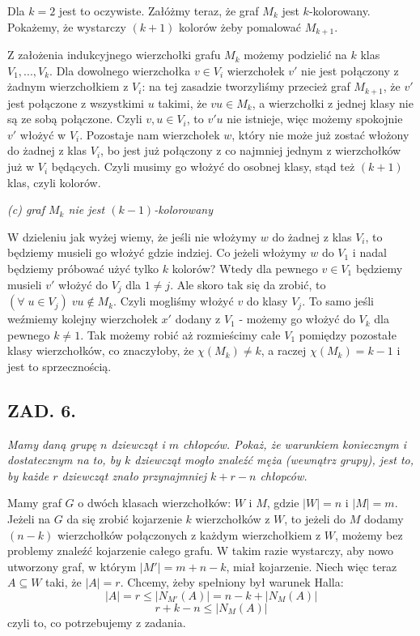 \documentclass{article}
\begin{document}
Dla $k=2$ jest to oczywiste. Załóżmy teraz, że graf $M_k$ jest $k$-kolorowany. Pokażemy, że wystarczy $(k+1)$ kolorów żeby pomalować $M_{k+1}$.

Z założenia indukcyjnego wierzchołki grafu $M_k$ możemy podzielić na $k$ klas $V_1,...,V_k$. Dla dowolnego wierzchołka $v\in V_i$ wierzchołek $v'$ nie jest połączony z żadnym wierzchołkiem z $V_i$: na tej zasadzie tworzyliśmy przecież graf $M_{k+1}$, że $v'$ jest połączone z wszystkimi $u$ takimi, że $vu\in M_k$, a wierzchołki z jednej klasy nie są ze sobą połączone. Czyli $v,u\in V_i$, to $v'u$ nie istnieje, więc możemy spokojnie $v'$ włożyć w $V_i$. Pozostaje nam wierzchołek $w$, który nie może już zostać włożony do żadnej z klas $V_i$, bo jest już połączony z co najmniej jednym z wierzchołków już w $V_i$ będących. Czyli musimy go włożyć do osobnej klasy, stąd też $(k+1)$ klas, czyli kolorów.
\medskip

\point \emph{\color{acc}(c) graf $M_k$ nie jest $(k-1)$-kolorowany}
\smallskip

W dzieleniu jak wyżej wiemy, że jeśli nie włożymy $w$ do żadnej z klas $V_i$, to będziemy musieli go włożyć gdzie indziej. Co jeżeli włożymy $w$ do $V_1$ i nadal będziemy próbować użyć tylko $k$ kolorów? Wtedy dla pewnego $v\in V_1$ będziemy musieli $v'$ włożyć do $V_j$ dla $1\neq j$. Ale skoro tak się da zrobić, to $(\forall\;u\in V_j)\;vu\not\in M_k$. Czyli mogliśmy włożyć $v$ do klasy $V_j$. To samo jeśli weźmiemy kolejny wierzchołek $x'$ dodany z $V_1$ - możemy go włożyć do $V_k$ dla pewnego $k\neq1$. Tak możemy robić aż rozmieścimy całe $V_1$ pomiędzy pozostałe klasy wierzchołków, co znaczyłoby, że $\chi(M_k)\neq k$, a raczej $\chi(M_k)=k-1$ i jest to sprzecznością.

\subsection*{ZAD. 6.}
\emph{Mamy daną grupę $n$ dziewcząt i $m$ chłopców. Pokaż, że warunkiem koniecznym i dostatecznym na to, by $k$ dziewcząt mogło znaleźć męża (wewnątrz grupy), jest to, by każde $r$ dziewcząt znało przynajmniej $k+r-n$ chłopców.}
\medskip

\medskip

Mamy graf $G$ o dwóch klasach wierzchołków: $W$ i $M$, gdzie $|W|=n$ i $|M|=m$. Jeżeli na $G$ da się zrobić kojarzenie $k$ wierzchołków z $W$, to jeżeli do $M$ dodamy $(n-k)$ wierzchołków połączonych z każdym wierzchołkiem z $W$, możemy bez problemy znaleźć kojarzenie całego grafu. W takim razie wystarczy, aby nowo utworzony graf, w którym $|M'|=m+n-k$, miał kojarzenie. Niech więc teraz $A\subseteq W$ taki, że $|A|=r$. Chcemy, żeby spełniony był warunek Halla:
$$|A|=r\leq |N_{M'}(A)|=n-k+|N_M(A)|$$
$$r+k-n\leq |N_M(A)|$$
czyli to, co potrzebujemy z zadania.
\end{document}
